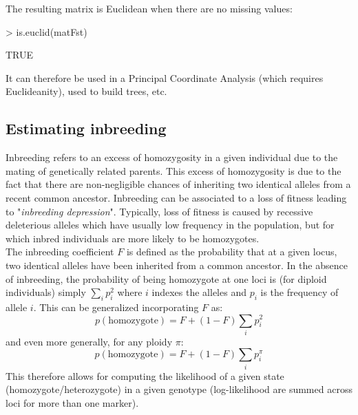 \documentclass{article}
\begin{document}
The resulting matrix is Euclidean when there are no missing values:
\begin{Schunk}
\begin{Sinput}
> is.euclid(matFst)
\end{Sinput}
\begin{Soutput}
[1] TRUE
\end{Soutput}
\end{Schunk}

It can therefore be used in a Principal Coordinate Analysis (which requires Euclideanity), used to
build trees, etc.







\subsection{Estimating inbreeding}
Inbreeding refers to an excess of homozygosity in a given individual due to the mating of
genetically related parents.
This excess of homozygosity is due to the fact that there are non-negligible chances of inheriting
two identical alleles from a recent common ancestor.
Inbreeding can be associated to a loss of fitness leading to "\textit{inbreeding depression}".
Typically, loss of fitness is caused by recessive deleterious alleles which have usually low
frequency in the population, but for which inbred individuals are more likely to be homozygotes.
\\


The inbreeding coefficient $F$ is defined as the probability that at a given locus, two identical
alleles have been inherited from a common ancestor.
In the absence of inbreeding, the probability of being homozygote at one loci is (for diploid
individuals) simply $\sum_i p_i^2$ where $i$ indexes the alleles and $p_i$ is the frequency of
allele $i$.
This can be generalized incorporating $F$ as:
$$
p(\mbox{homozygote}) = F + (1-F) \sum_ip_i^2
$$
and even more generally, for any ploidy $\pi$:
$$
p(\mbox{homozygote}) = F + (1-F) \sum_ip_i^{\pi}
$$
This therefore allows for computing the likelihood of a given state (homozygote/heterozygote) in a
given genotype (log-likelihood are summed across loci for more than one marker).
\\
\end{document}
